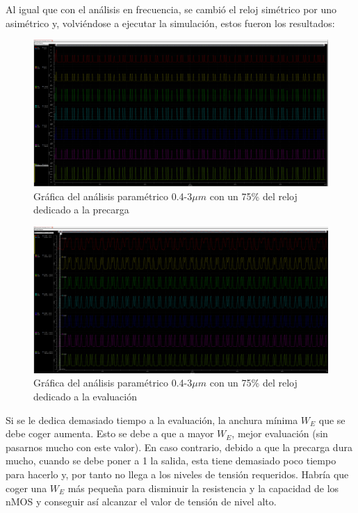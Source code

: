 \newpage Al igual que con el análisis en frecuencia, se cambió el reloj simétrico por uno asimétrico y, volviéndose a ejecutar la simulación, estos fueron los resultados:
\begin{figure}[H]%
\hspace{-10mm}
\includegraphics[width=1.2\textwidth]{figures/WEAsimMuchPreload.png}
\caption{Gráfica del análisis paramétrico 0.4-3$\mu m$ con un 75\% del reloj dedicado a la precarga}
\label{fig:WEAsimPreload}
\end{figure}
\vspace{-8mm}
\begin{figure}[H]%
\hspace{-10mm}
\includegraphics[width=1.2\textwidth]{figures/WEAsimMuchEval.png}
\caption{Gráfica del análisis paramétrico 0.4-3$\mu m$ con un 75\% del reloj dedicado a la evaluación}
\label{fig:WEAsimEval}
\end{figure} 
Si se le dedica demasiado tiempo a la evaluación, la anchura mínima $W_E$ que se debe coger aumenta. Esto se debe a que a mayor $W_E$, mejor evaluación (sin pasarnos mucho con este valor). En caso contrario, debido a que la precarga dura mucho, cuando se debe poner a 1 la salida, esta tiene demasiado poco tiempo para hacerlo y, por tanto no llega a los niveles de tensión requeridos. Habría que coger una $W_E$ más pequeña para disminuir la resistencia y la capacidad de los nMOS y conseguir así alcanzar el valor de tensión de nivel alto.
\restoregeometry